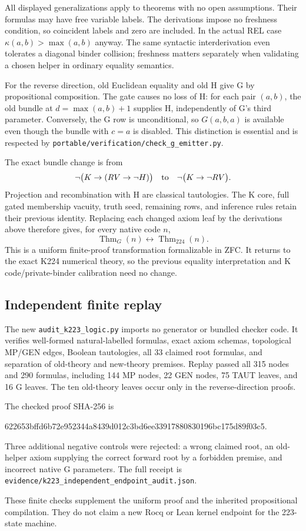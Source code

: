 All displayed generalizations apply to theorems with no open assumptions.
Their formulas may have free variable labels.  The derivations impose
no freshness condition, so coincident labels and zero are included.
In the actual REL case $\kappa(a,b)>\max(a,b)$ anyway.  The same
syntactic interderivation even tolerates a diagonal binder collision;
freshness matters separately when validating a chosen helper in ordinary
equality semantics.

For the reverse direction, old Euclidean equality and old H give G by
propositional composition.  The gate causes no loss of H: for each pair
$(a,b)$, the old bundle at $d=\max(a,b)+1$ supplies H, independently of
G's third parameter.  Conversely, the G row is unconditional, so
$G(a,b,a)$ is available even though the bundle with $c=a$ is disabled.
This distinction is essential and is respected by
\texttt{portable/verification/check\_g\_emitter.py}.

The exact bundle change is from
\[
 \neg\bigl(K\to(RV\to\neg H)\bigr)
 \quad\hbox{to}\quad
 \neg\bigl(K\to\neg RV\bigr).
\]
Projection and recombination with H are classical tautologies.  The K
core, full gated membership vacuity, truth seed, remaining rows, and
inference rules retain their previous identity.  Replacing each changed
axiom leaf by the derivations above therefore gives, for every native
code $n$,
\[
 \operatorname{Thm}_{G}(n)\leftrightarrow
 \operatorname{Thm}_{224}(n).
\]
This is a uniform finite-proof transformation formalizable in ZFC.  It
returns to the exact K224 numerical theory, so the previous equality
interpretation and K code/private-binder calibration need no change.

\subsection*{Independent finite replay}

The new \texttt{audit\_k223\_logic.py} imports no generator or bundled
checker code.  It verifies well-formed natural-labelled formulas, exact
axiom schemas, topological MP/GEN edges, Boolean tautologies, all 33
claimed root formulas, and separation of old-theory and new-theory
premises.  Replay passed all 315 nodes and 290 formulas, including 144 MP
nodes, 22 GEN nodes, 75 TAUT leaves, and 16 G leaves.  The ten old-theory
leaves occur only in the reverse-direction proofs.

The checked proof SHA-256 is
\begin{center}\ttfamily\small
622653bffd6b72e952344a8439d012c3bd6ee33917880830196bc175d89f03c5.
\end{center}
Three additional negative controls were rejected: a wrong claimed root,
an old-helper axiom supplying the correct forward root by a forbidden
premise, and incorrect native G parameters.  The full receipt is
\texttt{evidence/k223\_independent\_endpoint\_audit.json}.

These finite checks supplement the uniform proof and the inherited
propositional compilation.  They do not claim a new Rocq or Lean kernel
endpoint for the 223-state machine.
